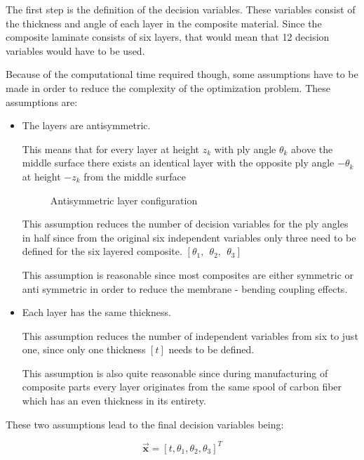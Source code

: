 The first step is the definition of the decision variables. These
variables consist of the thickness and angle of each layer in the
composite material. Since the composite laminate consists of six layers,
that would mean that 12 decision variables would have to be used.

Because of the computational time required though, some assumptions have
to be made in order to reduce the complexity of the optimization
problem. These assumptions are:

\begin{itemize}
\item
  The layers are antisymmetric.

This means that for every layer at height \(z_{k}\) with ply angle
\(\theta_{k}\) above the middle surface there exists an identical layer
with the opposite ply angle \(- \theta_{k}\) at height \(- z_{k}\) from
the middle surface


\begin{figure}[H]
    \centering
    
    \caption{Antisymmetric layer configuration}
\end{figure}


This assumption reduces the number of decision variables for the ply
angles in half since from the original six independent variables only
three need to be defined for the six layered composite.
\([ \theta_{1},\ \ \theta_{2},\ \ \theta_{3}]\)

This assumption is reasonable since most composites are either symmetric
or anti symmetric in order to reduce the membrane - bending coupling
effects.


\item
  Each layer has the same thickness.

This assumption reduces the number of independent variables from six to
just one, since only one thickness \([t]\) needs to be
defined.

This assumption is also quite reasonable since during manufacturing of
composite parts every layer originates from the same spool of carbon
fiber which has an even thickness in its entirety.
\end{itemize}

These two assumptions lead to the final decision variables being:

\begin{equation}
\vec{\mathbf{x}}=[t,\theta_{1},\theta_{2},\theta_{3}]^{T}
\label{eq:descisionvars}
\end{equation}
